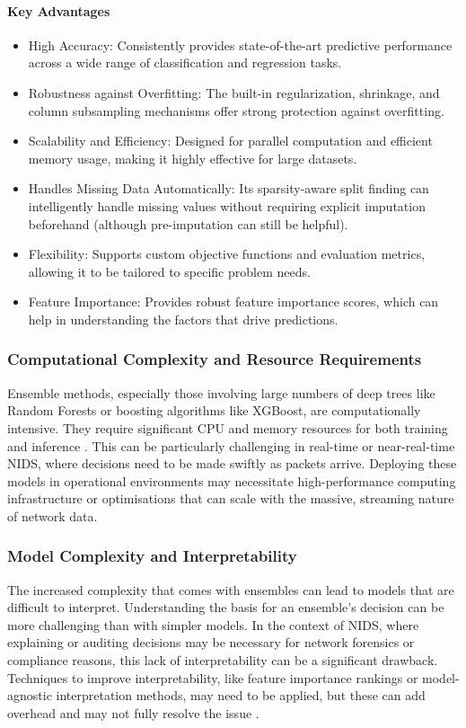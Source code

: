 \paragraph{Key Advantages} 
\begin{itemize}[noitemsep] 
\item High Accuracy: Consistently provides state-of-the-art predictive performance across a wide range of classification and regression tasks.
\item Robustness against Overfitting: The built-in regularization, shrinkage, and column subsampling mechanisms offer strong protection against overfitting.
\item Scalability and Efficiency: Designed for parallel computation and efficient memory usage, making it highly effective for large datasets.
\item Handles Missing Data Automatically: Its sparsity-aware split finding can intelligently handle missing values without requiring explicit imputation beforehand (although pre-imputation can still be helpful).
\item Flexibility: Supports custom objective functions and evaluation metrics, allowing it to be tailored to specific problem needs.
\item Feature Importance: Provides robust feature importance scores, which can help in understanding the factors that drive predictions.
\end{itemize} 
\subsubsection{Computational Complexity and Resource Requirements} 
Ensemble methods, especially those involving large numbers of deep trees like Random Forests or boosting algorithms like XGBoost, are computationally intensive. They require significant CPU and memory resources for both training and inference \parencite{aldhubaib2024network}. This can be particularly challenging in real-time or near-real-time NIDS, where decisions need to be made swiftly as packets arrive. Deploying these models in operational environments may necessitate high-performance computing infrastructure or optimisations that can scale with the massive, streaming nature of network data.

\subsubsection{Model Complexity and Interpretability} 
The increased complexity that comes with ensembles can lead to models that are difficult to interpret. Understanding the basis for an ensemble's decision can be more challenging than with simpler models. In the context of NIDS, where explaining or auditing decisions may be necessary for network forensics or compliance reasons, this lack of interpretability can be a significant drawback. Techniques to improve interpretability, like feature importance rankings or model-agnostic interpretation methods, may need to be applied, but these can add overhead and may not fully resolve the issue \parencite{liu2021improving}.

